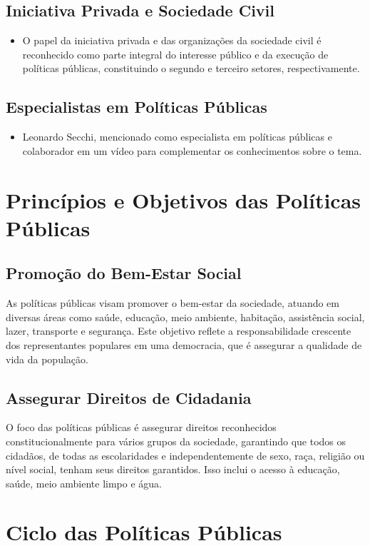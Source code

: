 \documentclass[
   article,       
   12pt,          
   oneside,       
   a4paper,       
   english,       
   brazil,        
   sumario=tradicional
   ]{abntex2}
\begin{document}
\subsection{Iniciativa Privada e Sociedade Civil}
\begin{itemize}
    \item O papel da iniciativa privada e das organizações da sociedade civil é reconhecido como parte integral do interesse público e da execução de políticas públicas, constituindo o segundo e terceiro setores, respectivamente.
\end{itemize}

\subsection{Especialistas em Políticas Públicas}
\begin{itemize}
    \item Leonardo Secchi, mencionado como especialista em políticas públicas e colaborador em um vídeo para complementar os conhecimentos sobre o tema.
\end{itemize}

\section{Princípios e Objetivos das Políticas Públicas}
\subsection{Promoção do Bem-Estar Social}
As políticas públicas visam promover o bem-estar da sociedade, atuando em diversas áreas como saúde, educação, meio ambiente, habitação, assistência social, lazer, transporte e segurança. Este objetivo reflete a responsabilidade crescente dos representantes populares em uma democracia, que é assegurar a qualidade de vida da população.

\subsection{Assegurar Direitos de Cidadania}
O foco das políticas públicas é assegurar direitos reconhecidos constitucionalmente para vários grupos da sociedade, garantindo que todos os cidadãos, de todas as escolaridades e independentemente de sexo, raça, religião ou nível social, tenham seus direitos garantidos. Isso inclui o acesso à educação, saúde, meio ambiente limpo e água.

\section{Ciclo das Políticas Públicas}
\end{document}
